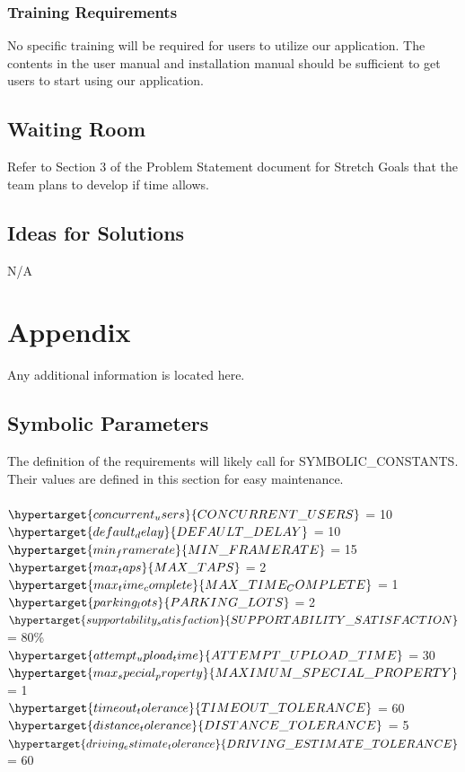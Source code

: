 \documentclass[12pt,letterpaper]{article}
\begin{document}
\subsubsection{Training Requirements}
No specific training will be required for users to utilize our application. The
contents in the user manual and installation manual should be sufficient to get
users to start using our application.
\subsection{Waiting Room}
Refer to Section 3 of the Problem Statement document for Stretch Goals that the
team plans to develop if time allows.
\subsection{Ideas for Solutions}
N/A

\newpage
\section{Appendix}
Any additional information is located here.
\label{appendix}
\subsection{Symbolic Parameters}
The definition of the requirements will likely call for SYMBOLIC\_CONSTANTS.
Their values are defined in this section for easy maintenance.\\ \\
$\hypertarget{concurrent_users}{CONCURRENT\_USERS}$ = 10 \\
$\hypertarget{default_delay}{DEFAULT\_DELAY}$ = 10 \\
$\hypertarget{min_framerate}{MIN\_FRAMERATE}$ = 15 \\
$\hypertarget{max_taps}{MAX\_TAPS}$ = 2 \\
$\hypertarget{max_time_complete}{MAX\_TIME_COMPLETE}$ = 1 \\
$\hypertarget{parking_lots}{PARKING\_LOTS}$ = 2 \\
$\hypertarget{supportability_satisfaction}{SUPPORTABILITY\_SATISFACTION}$ =
80\%\\
$\hypertarget{attempt_upload_time}{ATTEMPT\_UPLOAD\_TIME}$ = 30 \\
$\hypertarget{max_special_property}{MAXIMUM\_SPECIAL\_PROPERTY}$ = 1 \\
$\hypertarget{timeout_tolerance}{TIMEOUT\_TOLERANCE}$ = 60 \\
$\hypertarget{distance_tolerance}{DISTANCE\_TOLERANCE}$ = 5 \\
$\hypertarget{driving_estimate_tolerance}{DRIVING\_ESTIMATE\_TOLERANCE}$ = 60 \\
\end{document}
